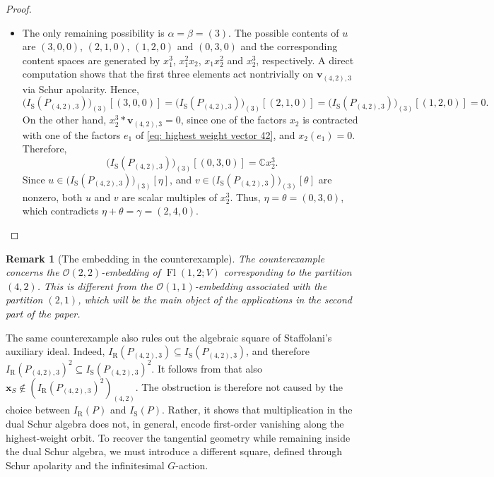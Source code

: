 \documentclass[a4paper,reqno]{amsart}
\theoremstyle{plainnopunct}
\theoremstyle{definitionnopunct}
\newtheorem{remark}[remark]{Remark}
\newcommand{\C}{\mathbb{C}}
\newcommand{\cO}{\mathcal{O}}
\newcommand{\bx}{\mathbf{x}}
\newcommand{\bv}{\mathbf{v}}
\DeclareMathOperator{\Fl}{Fl}
\begin{document}
\begin{proof}
\begin{itemize}
\item The only remaining possibility is $\alpha=\beta=(3)$.
The possible contents of $u$ are $(3,0,0)$, $(2,1,0)$, $(1,2,0)$ and $(0,3,0)$ and the corresponding content spaces are generated by $x_1^3$, $x_1^2x_2$, $x_1x_2^2$ and $x_2^3$, respectively. A direct computation shows that the first three elements act nontrivially on $\bv_{(4,2),3}$ via Schur apolarity. Hence,
\[
\bigl(I_{\mathrm S}(P_{(4,2),3})\bigr)_{(3)}[(3,0,0)]
 = 
\bigl(I_{\mathrm S}(P_{(4,2),3})\bigr)_{(3)}[(2,1,0)]
=
\bigl(I_{\mathrm S}(P_{(4,2),3})\bigr)_{(3)}[(1,2,0)]
=0.
\]
On the other hand, $x_2^3*\bv_{(4,2),3}=0$, since one of the factors $x_2$ is contracted with one of the factors $e_1$ of \eqref{eq: highest weight vector 42}, and $x_2(e_1)=0$.
Therefore,
\[
\bigl(I_{\mathrm S}(P_{(4,2),3})\bigr)_{(3)}[(0,3,0)]
=
\C x_2^3.
\]
Since $u
\in
\bigl(I_{\mathrm S}(P_{(4,2),3})\bigr)_{(3)}[\eta]$, and  $v \in \bigl(I_{\mathrm S}(P_{(4,2),3})\bigr)_{(3)}[\theta]$ are nonzero, both $u$ and $v$ are scalar multiples of $x_2^3$.
Thus, $\eta=\theta=(0,3,0)$, which contradicts $\eta+\theta
=
\gamma
=
(2,4,0)$.
\end{itemize}\end{proof}

\begin{remark}[The embedding in the counterexample]
\label{rem: embedding of square counterexample}
The counterexample concerns the $\cO(2,2)$-embedding of $\Fl(1,2;V)$ corresponding to the partition $(4,2)$. This is different from the $\cO(1,1)$-embedding associated with the partition $(2,1)$, which will be the main object of the applications in the second part of the paper.
\end{remark}

The same counterexample also rules out the algebraic square of Staffolani's auxiliary ideal. Indeed, $I_{\mathrm R}(P_{(4,2),3})
\subseteq
I_{\mathrm S}(P_{(4,2),3})$, and therefore $I_{\mathrm R}(P_{(4,2),3})^2
\subseteq
I_{\mathrm S}(P_{(4,2),3})^2$.
It follows from  that also $\bx_S
\notin
\left(
I_{\mathrm R}(P_{(4,2),3})^2
\right)_{(4,2)}$. The obstruction is therefore not caused by the choice between $I_{\mathrm R}(P)$ and $I_{\mathrm S}(P)$. Rather, it shows that multiplication in the dual Schur algebra does not, in general, encode first-order vanishing along the highest-weight orbit. To recover the tangential geometry while remaining inside the dual Schur algebra, we must introduce a different square, defined through Schur apolarity and the infinitesimal $G$-action.
\end{document}
